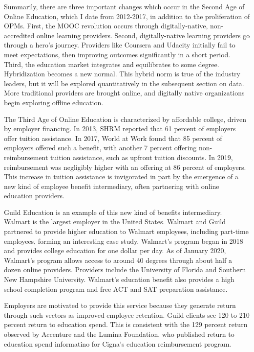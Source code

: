 \documentclass[review]{elsarticle}
\begin{document}
    Summarily, there are three important changes which occur in the Second Age of Online Education, which I date from 2012-2017, in addition to the proliferation of OPMs.
    First, the MOOC revolution occurs through digitally-native, non-accredited online learning providers.
    Second, digitally-native learning providers go through a hero's journey. Providers like Coursera and Udacity initially fail to meet expectations, then improving outcomes significantly in a short period.
    Third, the education market integrates and equilibrates to some degree. Hybridization becomes a new normal.
    This hybrid norm is true of the industry leaders, but it will be explored quantitatively in the subsequent section on data.
    More traditional providers are brought online, and digitally native organizations begin exploring offline education.

    The Third Age of Online Education is characterized by affordable college, driven by employer financing.
    In 2013, SHRM reported that 61 percent of employers offer tuition assistance\cite{cherry2014rejuvenating}.
    In 2017, World at Work found that 85 percent of employers offered such a benefit,
    with another 7 percent offering non-reimbursement tuition assistance, such as upfront tuition discounts\cite{talentculture_2018}.
    In 2019, reimbursement was negligibly higher with an offering at 86 percent of employers\cite{worldatwork_2019}.
    This increase in tuition assistance is invigorated in part by the emergence of a new kind of employee benefit intermediary,
    often partnering with online education providers.

    Guild Education is an example of this new kind of benefits intermediary. Walmart is the largest employer in the United States.
    Walmart and Guild partnered to provide higher education to Walmart employees, including part-time employees, forming an interesting case study.
    Walmart's program began in 2018 and provides college education for one dollar per day\cite{walmart_2018}.
    As of January 2020, Walmart's program allows access to around 40 degrees through about half a dozen online providers\cite{guild_walmart_2020}.
    Providers include the University of Florida and Southern New Hampshire University.
    Walmart's education benefit also provides a high school completion program and free ACT and SAT preparation assistance.

    Employers are motivated to provide this service because they generate return through such vectors as improved employee retention.
    Guild clients see 120 to 210 percent return to education spend\cite{hunter_2019}.
    This is consistent with the 129 percent return observed by Accenture and the Lumina Foundation,
    who published return to education spend informatino for Cigna's education reimbursement program\cite{mccann_2016}.
\end{document}
